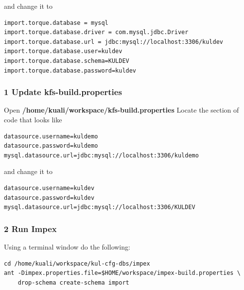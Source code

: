\documentclass[12pt,notitlepage]{article}
\begin{document}
and change it to

\begin{verbatim}
import.torque.database = mysql
import.torque.database.driver = com.mysql.jdbc.Driver
import.torque.database.url = jdbc:mysql://localhost:3306/kuldev
import.torque.database.user=kuldev
import.torque.database.schema=KULDEV
import.torque.database.password=kuldev
\end{verbatim}

\subsubsection{1 Update kfs-build.properties}
Open \textbf{/home/kuali/workspace/kfs-build.properties} Locate the section of code that looks like
\begin{verbatim}
datasource.username=kuldemo
datasource.password=kuldemo
mysql.datasource.url=jdbc:mysql://localhost:3306/kuldemo
\end{verbatim}

and change it to

\begin{verbatim}
datasource.username=kuldev
datasource.password=kuldev
mysql.datasource.url=jdbc:mysql://localhost:3306/KULDEV
\end{verbatim}

\subsubsection{2 Run Impex}
Using a terminal window do the following:
\begin{verbatim}
cd /home/kuali/workspace/kul-cfg-dbs/impex
ant -Dimpex.properties.file=$HOME/workspace/impex-build.properties \
    drop-schema create-schema import
\end{verbatim}
\end{document}
